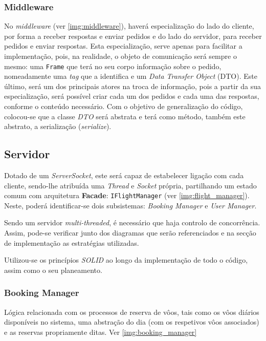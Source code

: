 \documentclass[a4paper,11pt]{scrreprt}
\begin{document}
\subsubsection{Middleware}

No \textit{middleware} (ver \ref{img:middleware}), haverá especialização do lado do cliente, por forma a receber respostas e enviar pedidos e
do lado do servidor, para receber pedidos e enviar respostas.
Esta especialização, serve apenas para facilitar a implementação, pois, na realidade, o objeto de comunicação
será sempre o mesmo: uma \texttt{Frame} que terá no seu corpo informação sobre o pedido, nomeadamente
uma \textit{tag} que a identifica e um \textit{Data Transfer Object} (DTO).
Este último, será um dos principais atores na troca de informação, pois a partir da sua especialização,
será possível criar cada um dos pedidos e cada uma das respostas, conforme o conteúdo necessário.
Com o objetivo de generalização do código, colocou-se que a classe \textit{DTO} será abstrata e terá como método,
também este abstrato, a serialização (\textit{serialize}).

\subsection{Servidor}
Dotado de um \textit{ServerSocket}, este será capaz de estabelecer ligação com cada cliente,
sendo-lhe atribuída uma \textit{Thread} e \textit{Socket} própria, partilhando um estado comum com arquitetura \textbf{Facade}: 
\texttt{IFlightManager} (ver \ref{img:flight_manager}).
Neste, poderá identificar-se dois subsistemas: \textit{Booking Manager} e \textit{User Manager}.

Sendo um servidor \textit{multi-threaded}, é necessário que haja controlo de concorrência.
Assim, pode-se verificar junto dos diagramas que serão referenciados e na secção de implementação
as estratégias utilizadas.

Utilizou-se os princípios \textit{SOLID} \cite{wiki:solid} ao longo da implementação de todo o código,
assim como o seu planeamento.

\subsubsection{Booking Manager}

Lógica relacionada com os processos de reserva de vôos, tais como os vôos diários disponíveis
no sistema, uma abstração do dia (com os respetivos vôos associados) e as reservas propriamente ditas.
Ver \ref{img:booking_manager}
\end{document}

